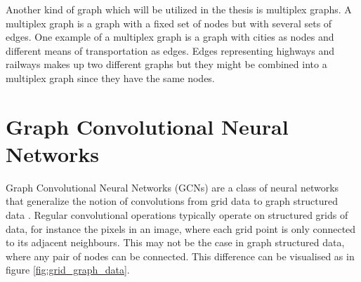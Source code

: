 Another kind of graph which will be utilized in the thesis is multiplex graphs. A multiplex graph is a graph with a fixed set of nodes but with several sets of edges. One example of a multiplex graph is a graph with cities as nodes and different means of transportation as edges. Edges representing highways and railways makes up two different graphs but they might be combined into a multiplex graph since they have the same nodes.




\section{Graph Convolutional Neural Networks}
\label{sec:gcn}

Graph Convolutional Neural Networks (GCNs) are a class of neural networks that generalize the notion of convolutions from grid data to graph structured data \cite{wu_review}. Regular convolutional operations typically operate on structured grids of data, for instance the pixels in an image, where each grid point is only connected to its adjacent neighbours. This may not be the case in graph structured data, where any pair of nodes can be connected. This difference can be visualised as in figure \ref{fig:grid_graph_data}. 

